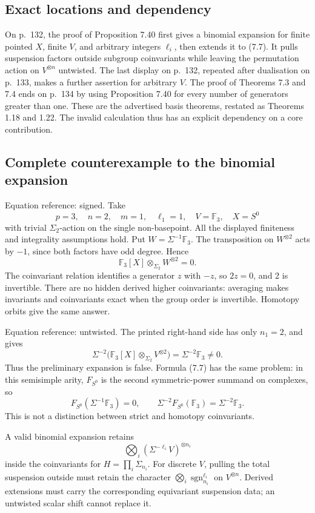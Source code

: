 \documentclass[10pt]{article}
\begin{document}
\subsection*{Exact locations and dependency}
On p. 132, the proof of Proposition 7.40 first gives a binomial expansion for finite pointed \(X\), finite \(V\), and arbitrary integers \(\ell_i\), then extends it to (7.7). It pulls suspension factors outside subgroup coinvariants while leaving the permutation action on \(V^{\otimes n}\) untwisted. The last display on p. 132, repeated after dualisation on p. 133, makes a further assertion for arbitrary \(V\). The proof of Theorems 7.3 and 7.4 ends on p. 134 by using Proposition 7.40 for every number of generators greater than one. These are the advertised basis theorems, restated as Theorems 1.18 and 1.22. The invalid calculation thus has an explicit dependency on a core contribution.\par
\subsection*{Complete counterexample to the binomial expansion}
Equation reference: signed. Take \[p=3,\quad n=2,\quad m=1,\quad
 \ell_1=1,\quad V=\mathbb F_3,\quad X=S^0\] with trivial \(\Sigma_2\)-action on the single non-basepoint. All the displayed finiteness and integrality assumptions hold. Put \(W=\Sigma^{-1}\mathbb F_3\). The transposition on \(W^{\otimes2}\) acts by \(-1\), since both factors have odd degree. Hence \[
 \mathbb F_3[X]\otimes_{\Sigma_2} W^{\otimes2}=0.\] The coinvariant relation identifies a generator \(z\) with \(-z\), so \(2z=0\), and 2 is invertible. There are no hidden derived higher coinvariants: averaging makes invariants and coinvariants exact when the group order is invertible. Homotopy orbits give the same answer.\par
Equation reference: untwisted. The printed right-hand side has only \(n_1=2\), and gives \[
 \Sigma^{-2}\bigl(\mathbb F_3[X]\otimes_{\Sigma_2}V^{\otimes2}\bigr)
 =\Sigma^{-2}\mathbb F_3\ne0.\] Thus the preliminary expansion is false. Formula (7.7) has the same problem: in this semisimple arity, \(F_{S^0}\) is the second symmetric-power summand on complexes, so \[F_{S^0}(\Sigma^{-1}\mathbb F_3)=0,\qquad
 \Sigma^{-2}F_{S^0}(\mathbb F_3)=\Sigma^{-2}\mathbb F_3.\] This is not a distinction between strict and homotopy coinvariants.\par
A valid binomial expansion retains \[\bigotimes_i(\Sigma^{-\ell_i}V)^{\otimes n_i}\] inside the coinvariants for \(H=\prod_i\Sigma_{n_i}\). For discrete \(V\), pulling the total suspension outside must retain the character \(\bigotimes_i\operatorname{sgn}_{n_i}^{\ell_i}\) on \(V^{\otimes n}\). Derived extensions must carry the corresponding equivariant suspension data; an untwisted scalar shift cannot replace it.\par
\end{document}
